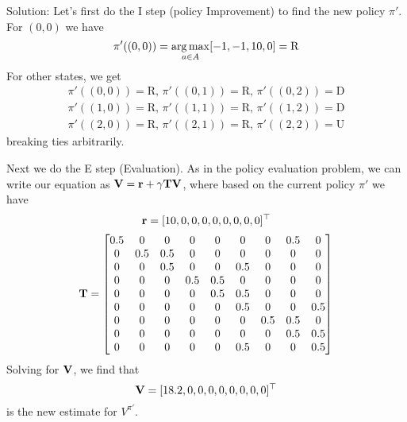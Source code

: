 \documentclass[12pt]{article}
\begin{document}
\noindent {}

\vspace{.5pc}


\begin{solution}
\noindent Solution: Let's first do the I step (policy Improvement) to find
the new policy $\pi'$. For $(0,0)$ we have
$$\pi'((0,0)) = \argmax_{a \in A} [ -1, -1, 10, 0] = \text{R}$$
For other states, we get
\begin{align*}
    \pi'((0,0)) = \text{R}, \,\pi'((0,1)) = \text{R}, \, \pi'((0,2)) = \text{D} \\
    \pi'((1,0)) = \text{R}, \, \pi'((1,1)) = \text{R}, \, \pi'((1,2)) = \text{D} \\
    \pi'((2,0)) = \text{R}, \, \pi'((2,1)) = \text{R}, \, \pi'((2,2)) = \text{U}
\end{align*}
breaking ties arbitrarily.

Next we do the E step (Evaluation). As in the policy evaluation problem, we can write our equation as $\mathbf{V} = \mathbf{r} + \gamma \mathbf{T} \mathbf{V}$, where
%
based on the current policy $\pi'$ we have 
%
$$\mathbf{r} = [10, 0, 0, 0, 0, 0, 0, 0, 0]^\top$$
$$\mathbf{T} = \begin{bmatrix}
0.5 & 0 & 0 & 0 & 0 & 0 & 0 & 0.5 & 0 \\
0 & 0.5 & 0.5 & 0 & 0 & 0 & 0 & 0 & 0 \\
0 & 0 & 0.5 & 0 & 0 & 0.5 & 0 & 0 & 0 \\
0 & 0 & 0 & 0.5 & 0.5 & 0 & 0 & 0 & 0 \\
0 & 0 & 0 & 0 & 0.5 & 0.5 & 0 & 0 & 0 \\
0 & 0 & 0 & 0 & 0 & 0.5 & 0 & 0 & 0.5 \\
0 & 0 & 0 & 0 & 0 & 0 & 0.5 & 0.5 & 0 \\
0 & 0 & 0 & 0 & 0 & 0 & 0 & 0.5 & 0.5 \\
0 & 0 & 0 & 0 & 0 & 0.5 & 0 & 0 & 0.5 \\
\end{bmatrix}$$
Solving for $\mathbf{V}$, we find that
$$\mathbf{V} = [18.2, 0, 0, 0, 0, 0, 0, 0, 0]^\top$$
is the new estimate for $V^{\pi'}$.
\end{solution}
\pagebreak

\vspace{.5pc}
\end{document}
